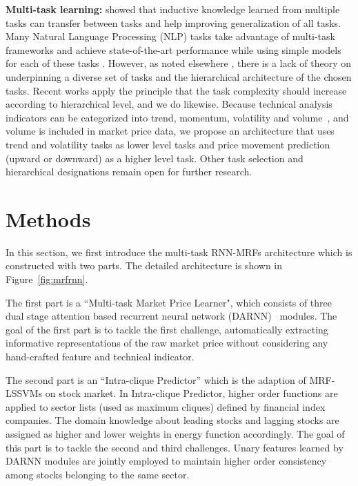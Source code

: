 \textbf{Multi-task learning:} 
showed that inductive knowledge learned from multiple tasks can
transfer between tasks and help improving generalization of all
tasks. Many Natural Language Processing (NLP) tasks take
advantage of multi-task frameworks and achieve state-of-the-art
performance while using simple models for each of these tasks
\cite{sogaard2016deep,hashimoto2016joint}. However, as noted
elsewhere \cite{caruana1993multitask,ruder2017overview}, there is
a lack of theory on underpinning a diverse set of tasks and the
hierarchical architecture of the chosen tasks. Recent works
\cite{sogaard2016deep,hashimoto2016joint} apply the principle
that the task complexity should increase according to
hierarchical level, and we do likewise. Because technical
analysis indicators can be categorized into trend, momentum,
volatility and volume~\cite{kirkpatrick2010technical}, and volume
is included in market price data, we propose an architecture that
uses trend and volatility tasks as lower level tasks and price
movement prediction (upward or downward) as a higher level task.
Other task selection and hierarchical designations remain open
for further research.

\section{Methods}
\label{sec:meth}

In this section, we first introduce the multi-task RNN-MRFs
architecture which is constructed with two parts. The detailed
architecture is shown in Figure~\ref{fig:mrfrnn}.

The first part is a ``Multi-task Market Price Learner", which
consists of three dual stage attention based recurrent neural
network (DARNN)~\cite{qin2017dual} modules. The goal of the first
part is to tackle the first challenge, \ie automatically
extracting informative representations of the raw market price
without considering any hand-crafted feature and technical
indicator.

The second part is an ``Intra-clique Predictor'' which is the
adaption of MRF-LSSVMs on stock market. In Intra-clique
Predictor, higher order functions are applied to sector lists
(used as maximum cliques) defined by financial index companies.
The domain knowledge about leading stocks and lagging stocks are
assigned as higher and lower weights in energy function
accordingly. The goal of this part is to tackle the second and
third challenges. Unary features learned by DARNN modules are
jointly employed to maintain higher order consistency among
stocks belonging to the same sector.


